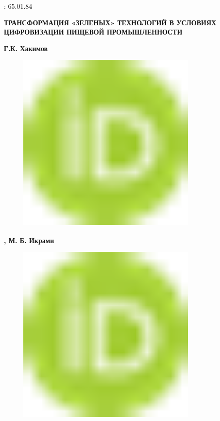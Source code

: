 : 65.01.84

{\bfseries ТРАНСФОРМАЦИЯ «ЗЕЛЕНЫХ» ТЕХНОЛОГИЙ В УСЛОВИЯХ ЦИФРОВИЗАЦИИ
ПИЩЕВОЙ ПРОМЫШЛЕННОСТИ}

{\bfseries Г.К. Хакимов}

\begin{figure}[H]
	\centering
	\includegraphics[width=0.8\textwidth]{media/ekon2/image1}
	\caption*{}
\end{figure}
{\bfseries \textsuperscript{\envelope },
М. Б. Икрами}

\begin{figure}[H]
	\centering
	\includegraphics[width=0.8\textwidth]{media/ekon2/image1}
	\caption*{}
\end{figure}


